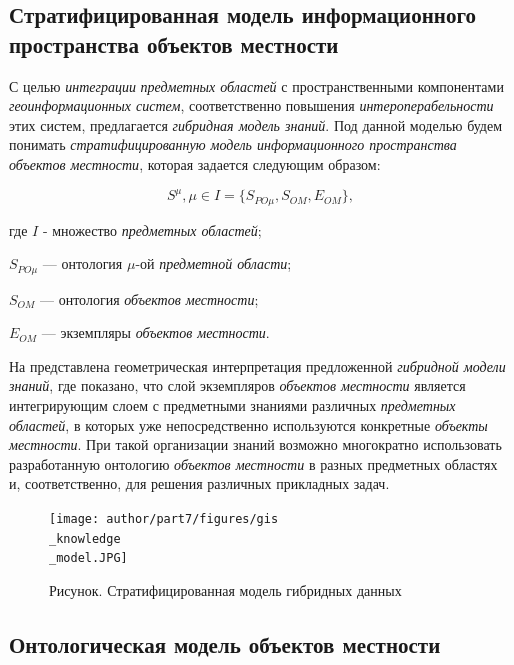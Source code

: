 \subsection{Стратифицированная модель информационного пространства объектов местности}
\label{chapter_gis_sec_strat_model}

С целью \textit{интеграции} \textit{предметных областей} с пространственными компонентами \textit{геоинформационных систем}, соответственно повышения \textit{интероперабельности} этих систем, предлагается \textit{гибридная модель знаний}. Под данной моделью будем понимать \textit{стратифицированную модель информационного пространства объектов местности}, которая задается следующим образом:

\begin{equation} 
\label{<eq2_1>} 
S^{\mu}, \mu  \in I = \{S_{PO\mu}, S_{OM}, E_{OM}\},
\end{equation} 

\parindent=8mm
\noindent \hangindent=22mm 
где $I$ - множество \textit{предметных областей};

\hangindent=22mm 
$S_{PO\mu}$ --- онтология ${\mu}$-ой \textit{предметной области};

\hangindent=30mm 
$S_{OM}$ --- онтология \textit{объектов местности};

\hangindent=30mm 
$E_{OM}$ --- экземпляры \textit{объектов местности}.

На  представлена геометрическая интерпретация предложенной \textit{гибридной модели знаний}, где показано, что слой экземпляров \textit{объектов местности} является интегрирующим слоем с предметными знаниями различных \textit{предметных областей}, в которых уже непосредственно используются конкретные \textit{объекты местности}. При такой организации знаний возможно многократно использовать  разработанную онтологию \textit{объектов местности} в разных предметных областях и, соответственно, для решения различных прикладных задач.

\begin{figure}[H]
	\center
	\caption{Рисунок. Стратифицированная модель гибридных данных}
	\texttt{[image: author/part7/figures/gis\\\_knowledge\\\_model.JPG]}
	\label{fig:pic2_1}
\end{figure}

\subsection{Онтологическая модель объектов местности}
\label{chapter_gis_sec_onto_model}

